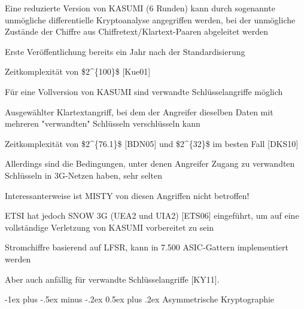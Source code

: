 \documentclass[a4paper]{article}
\makeatletter
\renewcommand{\section}{\@startsection{section}{1}{0mm}%
 {-1ex plus -.5ex minus -.2ex}%
 {0.5ex plus .2ex}%
 {\normalfont\large\bfseries}}
\makeatother
\begin{document}
\begin{multicols}{3}
      \begin{itemize*}
            \item Eine reduzierte Version von KASUMI (6 Runden) kann durch sogenannte
            unmögliche differentielle Kryptoanalyse angegriffen werden, bei der
            unmögliche Zustände der Chiffre aus Chiffretext/Klartext-Paaren
            abgeleitet werden
            \begin{itemize*}
                  \item Erste Veröffentlichung bereits ein Jahr nach der Standardisierung
                  \item Zeitkomplexität von \$2\^{}\{100\}\$ {[}Kue01{]}
            \end{itemize*}
            \item Für eine Vollversion von KASUMI sind verwandte Schlüsselangriffe
            möglich
            \begin{itemize*}
                  \item Ausgewählter Klartextangriff, bei dem der Angreifer dieselben Daten mit mehreren "verwandten" Schlüsseln verschlüsseln kann
                  \item Zeitkomplexität von \$2\^{}\{76.1\}\$ {[}BDN05{]} und \$2\^{}\{32\}\$ im besten Fall {[}DKS10{]}
                  \item Allerdings sind die Bedingungen, unter denen Angreifer Zugang zu verwandten Schlüsseln in 3G-Netzen haben, sehr selten
                  \item Interessanterweise ist MISTY von diesen Angriffen nicht betroffen!
            \end{itemize*}
            \item ETSI hat jedoch SNOW 3G (UEA2 und UIA2) {[}ETS06{]} eingeführt, um auf
            eine vollständige Verletzung von KASUMI vorbereitet zu sein
            \begin{itemize*}
                  \item Stromchiffre basierend auf LFSR, kann in 7.500 ASIC-Gattern implementiert werden
                  \item Aber auch anfällig für verwandte Schlüsselangriffe {[}KY11{]}.
            \end{itemize*}
      \end{itemize*}


      \section{Asymmetrische
        Kryptographie}


\end{multicols}
\end{document}
